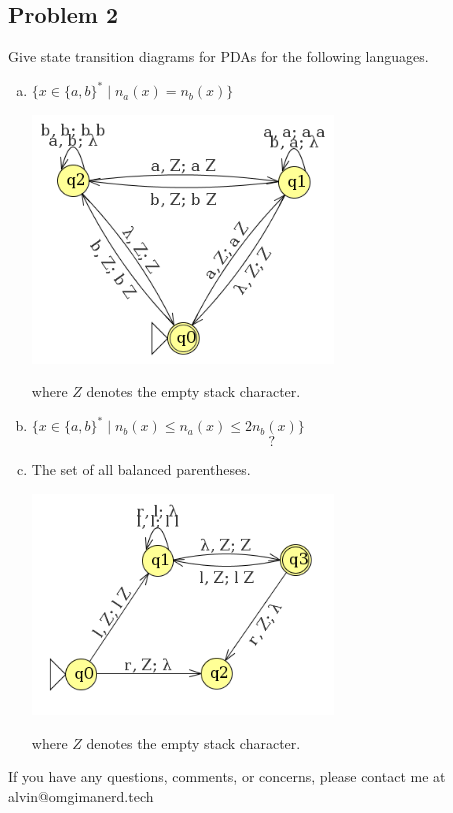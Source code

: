 \documentclass{math}
\begin{document}
\subsection*{Problem 2}
Give state transition diagrams for PDAs for the following languages.
\begin{enumerate}[(a)]
  \item \( \{x\in\{a,b\}^*\mid n_a(x) = n_b(x)\} \)
  \begin{center}
    \includegraphics[width=8cm]{assets/hw_9_2a.png}
  \end{center}
  where \( Z \) denotes the empty stack character.
  \item \( \{x\in\{a,b\}^*\mid n_b(x)\le n_a(x)\le 2n_b(x)\} \)
  \[ ? \]
  \item The set of all balanced parentheses.
  \begin{center}
    \includegraphics[width=8cm]{assets/hw_9_2c.png}
  \end{center}
  where \( Z \) denotes the empty stack character.
\end{enumerate}

\begin{center}
  If you have any questions, comments, or concerns, please contact me at
  alvin@omgimanerd.tech
\end{center}
\end{document}
